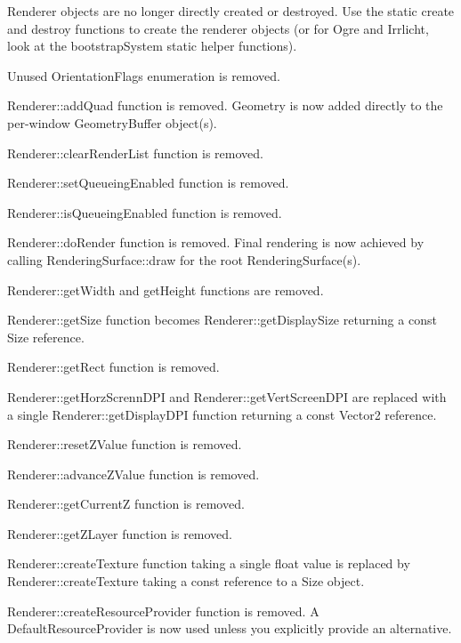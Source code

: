\begin{DoxyItemize}
\item Renderer objects are no longer directly created or destroyed. Use the static create and destroy functions to create the renderer objects (or for Ogre and Irrlicht, look at the bootstrap\+System static helper functions).
\item Unused {\ttfamily Orientation\+Flags} enumeration is removed.
\item {\ttfamily Renderer\+::add\+Quad} function is removed. Geometry is now added directly to the per-\/window Geometry\+Buffer object(s).
\item {\ttfamily Renderer\+::clear\+Render\+List} function is removed.
\item {\ttfamily Renderer\+::set\+Queueing\+Enabled} function is removed.
\item {\ttfamily Renderer\+::is\+Queueing\+Enabled} function is removed.
\item {\ttfamily Renderer\+::do\+Render} function is removed. Final rendering is now achieved by calling Rendering\+Surface\+::draw for the root Rendering\+Surface(s).
\item {\ttfamily Renderer\+::get\+Width} and {\ttfamily get\+Height} functions are removed.
\item {\ttfamily Renderer\+::get\+Size} function becomes Renderer\+::get\+Display\+Size returning a const Size reference.
\item {\ttfamily Renderer\+::get\+Rect} function is removed.
\item {\ttfamily Renderer\+::get\+Horz\+Screnn\+D\+PI} and {\ttfamily Renderer\+::get\+Vert\+Screen\+D\+PI} are replaced with a single Renderer\+::get\+Display\+D\+PI function returning a const Vector2 reference.
\item {\ttfamily Renderer\+::reset\+Z\+Value} function is removed.
\item {\ttfamily Renderer\+::advance\+Z\+Value} function is removed.
\item {\ttfamily Renderer\+::get\+CurrentZ} function is removed.
\item {\ttfamily Renderer\+::get\+Z\+Layer} function is removed.
\item Renderer\+::create\+Texture function taking a single float value is replaced by Renderer\+::create\+Texture taking a const reference to a Size object.
\item {\ttfamily Renderer\+::create\+Resource\+Provider} function is removed. A Default\+Resource\+Provider is now used unless you explicitly provide an alternative.

\end{DoxyItemize}

